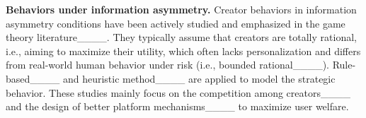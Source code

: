 \textbf{Behaviors under information asymmetry.} Creator behaviors in information asymmetry conditions
have been actively studied and emphasized in the game theory literature____. 
They typically assume that creators are totally rational, i.e., aiming to maximize their utility, which often lacks personalization and differs from real-world human behavior under risk (i.e., bounded rational____). Rule-based____ and heuristic method____ are applied to model the strategic behavior. These studies mainly focus on the competition among creators____ and the design of better platform mechanisms____ to maximize user welfare.



